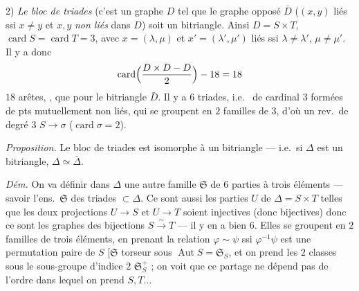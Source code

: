 \documentclass[11pt,a4paper]{article}
\begin{document}
2) \emph{Le bloc de triades} (c'est un graphe \struck{\ill{}} $D$ tel que le graphe opposé $\bar D$ ($(x,y)$ liés  ssi $x\neq y$ et $x,y$ \emph{non liés} dans $D$) soit un bitriangle. Ainsi $D=S\times T$, $\operatorname{card}S=\operatorname{card}T=3$, avec $x=(\lambda,\mu)$ et $x'=(\lambda',\mu')$ liés ssi $\lambda\neq\lambda'$, $\mu\neq\mu'$. Il y a donc
\[
\operatorname{card}\Bigl(\frac{D\times D-D}{2}\Bigr)-18=18
\]
 $18$ arêtes, \ill{} \ill{}, \ill{} que pour le bitriangle $\bar D$. Il y a $6$ triades, i.e.\ \struck{\ill{}}  de cardinal $3$ formées de pts mutuellement non liés, qui se groupent en $2$ familles de $3$, d'où un rev.\ de degré $3$ $S\to\sigma$ ($\operatorname{card}\sigma=2$).

\emph{Proposition.} Le bloc de triades est isomorphe à un bitriangle --- i.e.\ si $\Delta$  est un bitriangle, $\Delta\simeq\bar\Delta$.

\emph{Dém.} On va définir dans $\Delta$ une autre famille $\mathfrak{S}$ de $6$ parties à trois éléments --- savoir l'ens.\ $\mathfrak{S}$ des triades $\subset\Delta$. Ce sont aussi les parties $U$ de $\Delta=S\times T$  telles que les deux projections $U\to S$ et $U\to T$ soient injectives (donc bijectives) donc ce sont les graphes des bijections $S\xrightarrow{\sim}T$ --- il y en a bien $6$. Elles se groupent en $2$ familles de trois éléments, en prenant la relation $\varphi\sim\psi$ ssi $\varphi^{-1}\psi$ est une permutation paire de $S$  [$\mathfrak{S}$  \struck{\ill{}} torseur sous  $\operatorname{Aut}S=\mathfrak{S}_S$, et on prend les $2$ classes sous le sous-groupe d'indice $2$ $\mathfrak{S}^+_S$ ; on voit que ce partage ne dépend pas de l'ordre dans lequel on prend $S,T\ldots$
\end{document}
